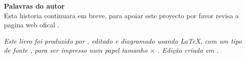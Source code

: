 \cleardoublepage

\thispagestyle{empty}
\vspace*{\fill}%
\begin{center}
\textbf{\huge Palavras do autor}\\
\vspace{1ex}
Esta historia continuara em breve, 
para apoiar este proyecto por favor revisa a pagina web ofical \BookHomePage.
\end{center}
\vspace*{\fill}%

\null
\vfill
\newpage

\null
\vfill
\thispagestyle{empty}



{\normalsize \itshape Este livro foi produzido por \BookAuthor, editado e diagramado usando \LaTeX,
com um tipo de fonte \FprShowFont, 
para ser impresso num papel tamanho \BookPaperHeight $\times$ \BookPaperWidth. Edição criada em \BookEditionData.}

